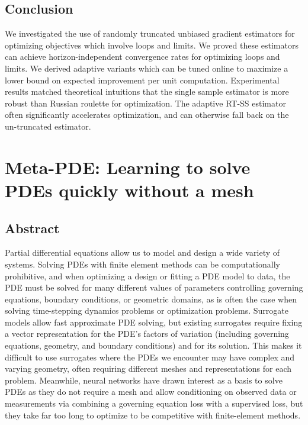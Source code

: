 \documentclass{puthesis}
\begin{document}









\section{Conclusion}
We investigated the use of randomly truncated unbiased gradient estimators for
optimizing objectives which involve loops and limits.
We proved these estimators can achieve
horizon-independent convergence rates for optimizing loops and limits.
We derived adaptive variants which can be tuned online
to maximize a lower bound on expected improvement per unit
computation. Experimental results matched theoretical intuitions that the
single sample estimator is more robust than Russian roulette for optimization.
The adaptive RT-SS estimator often significantly accelerates
optimization, and can otherwise fall back on the un-truncated estimator.


\chapter{Meta-PDE: Learning to solve PDEs quickly without a mesh}

\section{Abstract}
Partial differential equations allow us to
model and design a wide variety of systems.
Solving PDEs with finite element methods
can be computationally prohibitive,
and when optimizing a design or fitting a PDE model to data,
the PDE must be solved for many different values of parameters controlling governing equations, boundary conditions, or geometric domains,
as is often the case when solving time-stepping dynamics problems or optimization problems.
Surrogate models allow fast approximate PDE solving, but existing surrogates
require fixing a vector representation for the PDE's factors of variation
(including governing equations, geometry, and boundary conditions) and for its
solution.
This makes it difficult to use surrogates
where the PDEs we encounter may have complex and varying geometry,
often requiring different meshes and representations for each problem.
Meanwhile, neural networks have drawn interest as a basis to solve PDEs
as they do not require a mesh and allow conditioning on observed data or measurements
via combining a governing equation loss with a supervised loss,
but they take far too long to optimize to be competitive with finite-element methods.
\end{document}
